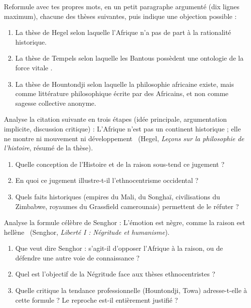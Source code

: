 \documentclass[11pt]{article}
\newcounter{popsec}
\newcounter{popsub}
\newcommand{\courssub}[1]{%
  \stepcounter{popsub}%
  \par\vspace{9pt}\noindent{\popxbold\fontsize{11.5}{13}\selectfont\color{popink}{\color{poporange}\thepopsec.\thepopsub}\hspace{6pt}#1}\par\nopagebreak\vspace{4pt}
}
\begin{document}
\courssub{Je m'entraîne}

\begin{exercice}
Reformule avec tes propres mots, en un petit paragraphe argumenté (dix lignes maximum), chacune des thèses suivantes, puis indique une objection possible :
\begin{enumerate}
\item La thèse de Hegel selon laquelle l'Afrique n'a pas de part à la rationalité historique.
\item La thèse de Tempels selon laquelle les Bantous possèdent une ontologie de la \guillemotleft force vitale \guillemotright.
\item La thèse de Hountondji selon laquelle la philosophie africaine existe, mais comme littérature philosophique écrite par des Africains, et non comme sagesse collective anonyme.
\end{enumerate}
\end{exercice}

\begin{exercice}
Analyse la citation suivante en trois étapes (idée principale, argumentation implicite, discussion critique) : \guillemotleft L'Afrique n'est pas un continent historique ; elle ne montre ni mouvement ni développement \guillemotright\ (Hegel, \emph{Leçons sur la philosophie de l'histoire}, résumé de la thèse).
\begin{enumerate}
\item Quelle conception de l'Histoire et de la raison sous-tend ce jugement ?
\item En quoi ce jugement illustre-t-il l'ethnocentrisme occidental ?
\item Quels faits historiques (empires du Mali, du Songhaï, civilisations du Zimbabwe, royaumes du Grassfield camerounais) permettent de le réfuter ?
\end{enumerate}
\end{exercice}

\begin{exercice}
Analyse la formule célèbre de Senghor : \guillemotleft L'émotion est nègre, comme la raison est hellène \guillemotright\ (Senghor, \emph{Liberté I : Négritude et humanisme}).
\begin{enumerate}
\item Que veut dire Senghor : s'agit-il d'opposer l'Afrique à la raison, ou de défendre une autre voie de connaissance ?
\item Quel est l'objectif de la Négritude face aux thèses ethnocentristes ?
\item Quelle critique la tendance professionnelle (Hountondji, Towa) adresse-t-elle à cette formule ? Le reproche est-il entièrement justifié ?
\end{enumerate}
\end{exercice}
\end{document}

